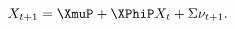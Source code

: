 \begin{equation} \label{eq:nXvarsP}
	\XvarsFwd = \XmuP + \XPhiP \Xvars  + \XSigma \error .
\end{equation}